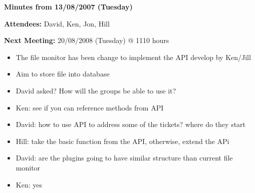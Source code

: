\documentclass{letter}
\begin{document}
\textbf{Minutes from 13/08/2007 (Tuesday)}

\textbf{Attendees:} David, Ken, Jon, Hill

\textbf{Next Meeting:} 20/08/2008 (Tuesday) @ 1110 hours

\begin{itemize}
 \item The file monitor has been change to implement the API develop by Ken/Jill
 \item Aim to store file into database
\end{itemize}


\begin{itemize}

 \item David asked? How will the groups be able to use it?
 \item Ken: see if you can reference methods from API
 \item David: how to use API to address some of the tickets? where do they start
 \item Hill: take the basic function from the API, otherwise, extend the APi
 \item David: are the plugins going to have similar structure than current file monitor
 \item Ken: yes


\end{itemize}
\end{document}
